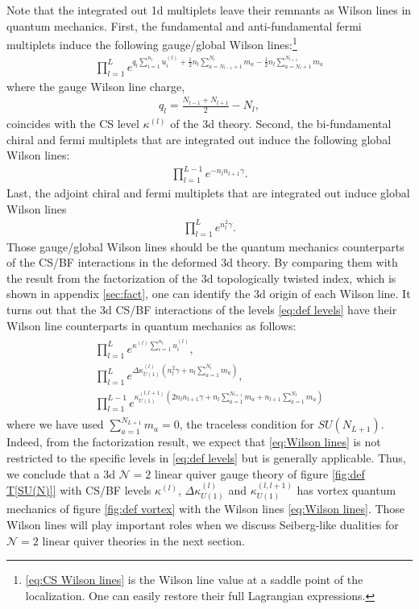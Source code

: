 \documentclass[a4paper,11pt]{article}
\begin{document}
Note that the integrated out 1d multiplets leave their remnants as Wilson lines in quantum mechanics. First, the fundamental and anti-fundamental fermi multiplets induce the following gauge/global Wilson lines:\footnote{\eqref{eq:CS Wilson lines} is the Wilson line value at a saddle point of the localization. One can easily restore their full Lagrangian expressions.}
\begin{align}
\label{eq:CS Wilson lines}
\prod_{l = 1}^L e^{q_l \sum_{i = 1}^{n_l} u^{(l)}_i+\frac{1}{2} n_l \sum_{a = N_{l-1}+1}^{N_l} m_a-\frac{1}{2} n_l \sum_{a = N_l+1}^{N_{l+1}} m_a}
\end{align}
where the gauge Wilson line charge,
\begin{align}
q_l = \frac{N_{l-1}+N_{l+1}}{2}-N_l,
\end{align}
coincides with the CS level $\kappa^{(l)}$ of the 3d theory. Second, the bi-fundamental chiral and fermi multiplets that are integrated out induce the following global Wilson lines:
\begin{align}
\prod_{l = 1}^{L-1} e^{-n_l n_{l+1} \gamma}.
\end{align}
Last, the adjoint chiral and fermi multiplets that are integrated out induce global Wilson lines
\begin{align}
\prod_{l = 1}^L e^{n_{l}^2 \gamma}.
\end{align}
Those gauge/global Wilson lines should be the quantum mechanics counterparts of the CS/BF interactions in the deformed 3d theory. By comparing them with the result from the factorization of the 3d topologically twisted index, which is shown in appendix \ref{sec:fact}, one can identify the 3d origin of each Wilson line. It turns out that the 3d CS/BF interactions of the levels \eqref{eq:def levels} have their Wilson line counterparts in quantum mechanics as follows:
\begin{gather}
\begin{gathered}
\label{eq:Wilson lines}
\prod_{l = 1}^L e^{\kappa^{(l)} \sum_{i = 1}^{n_l} u^{(l)}_i}, \\
\prod_{l = 1}^L e^{\Delta \kappa_{U(1)}^{(l)} (n_l^2 \gamma+n_l \sum_{a = 1}^{N_l} m_a)}, \\
\prod_{l = 1}^{L-1} e^{\kappa_{U(1)}^{(l,l+1)} (2 n_l n_{l+1} \gamma+n_l \sum_{a = 1}^{N_{l+1}} m_a+n_{l+1} \sum_{a = 1}^{N_l} m_a)}
\end{gathered}
\end{gather}
where we have used $\sum_{a = 1}^{N_{L+1}} m_a = 0$, the traceless condition for $SU(N_{L+1})$. Indeed, from the factorization result, we expect that \eqref{eq:Wilson lines} is not restricted to the specific levels in \eqref{eq:def levels} but is generally applicable. Thus, we conclude that a 3d $\mathcal N = 2$ linear quiver gauge theory of figure \ref{fig:def T[SU(N)]} with CS/BF levels $\kappa^{(l)}$, $\Delta \kappa_{U(1)}^{(l)}$ and $\kappa_{U(1)}^{(l,l+1)}$ has vortex quantum mechanics of figure \ref{fig:def vortex} with the Wilson lines \eqref{eq:Wilson lines}. Those Wilson lines will play important roles when we discuss Seiberg-like dualities for $\mathcal N = 2$ linear quiver theories in the next section.
\\
\end{document}

